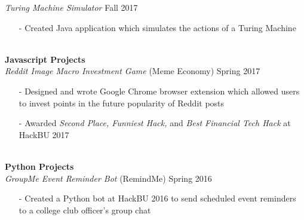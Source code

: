 \documentclass[11pt]{article}
\newcommand{\Indent}{\indent\indent}
\begin{document}
            \Indent \small\textit{Turing Machine Simulator} \hfill \small{Fall 2017}\indent\\
                \Indent\begin{minipage}{\dimexpr\textwidth-6cm}
                    \begin{itemize}[noitemsep, topsep=0pt]
                        \item[-] Created Java application which simulates the actions of a Turing Machine
                    \end{itemize}\vspace{0mm}
                \end{minipage}\\
        \indent \small\textbf{Javascript Projects}\\
            \Indent \small\textit{Reddit Image Macro Investment Game}\small{ (Meme Economy)} \hfill \small{Spring 2017}\indent\vspace{0.5mm}\\
                \Indent\begin{minipage}{\dimexpr\textwidth-6cm}
                    \begin{itemize}[noitemsep, topsep=0pt]
                        \item[-] Designed and wrote Google Chrome browser extension which allowed users to invest points in the future popularity of Reddit posts
                        \item[-] Awarded \textit{Second Place, Funniest Hack,} and \textit{Best Financial Tech Hack} at HackBU 2017
                    \end{itemize}\vspace{0mm}
                \end{minipage}\\
        \indent \small\textbf{Python Projects}\\
            \Indent \small\textit{GroupMe Event Reminder Bot}\small{ (RemindMe)} \hfill \small{Spring 2016}\indent\vspace{0.5mm}\\
                \Indent\begin{minipage}{\dimexpr\textwidth-6cm}
                    \begin{itemize}[noitemsep, topsep=0pt]
                        \item[-] Created a Python bot at HackBU 2016 to send scheduled event reminders to a college club officer's group chat
                    \end{itemize}\vspace{0mm}
                \end{minipage}
\end{document}
